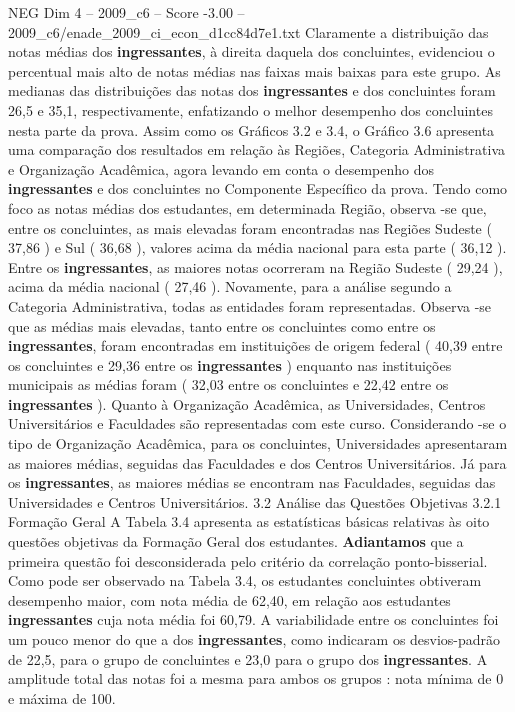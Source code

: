 \begin{textsample}{NEG Dim 4 – 2009\_c6 – Score -3.00 – 2009\_c6/enade\_2009\_ci\_econ\_d1cc84d7e1.txt}
Claramente a distribuição das notas médias dos \textbf{ingressantes}, à direita daquela dos concluintes, evidenciou o percentual mais alto de notas médias nas faixas mais baixas para este grupo.
As medianas das distribuições das notas dos \textbf{ingressantes} e dos concluintes foram 26,5 e 35,1, respectivamente, enfatizando o melhor desempenho dos concluintes nesta parte da prova.
Assim como os Gráficos 3.2 e 3.4, o Gráfico 3.6 apresenta uma comparação dos resultados em relação às Regiões, Categoria Administrativa e Organização Acadêmica, agora levando em conta o desempenho dos \textbf{ingressantes} e dos concluintes no Componente Específico da prova.
Tendo como foco as notas médias dos estudantes, em determinada Região, observa -se que, entre os concluintes, as mais elevadas foram encontradas nas Regiões Sudeste ( 37,86 ) e Sul ( 36,68 ), valores acima da média nacional para esta parte ( 36,12 ).
Entre os \textbf{ingressantes}, as maiores notas ocorreram na Região Sudeste ( 29,24 ), acima da média nacional ( 27,46 ).
Novamente, para a análise segundo a Categoria Administrativa, todas as entidades foram representadas.
Observa -se que as médias mais elevadas, tanto entre os concluintes como entre os \textbf{ingressantes}, foram encontradas em instituições de origem federal ( 40,39 entre os concluintes e 29,36 entre os \textbf{ingressantes} ) enquanto nas instituições municipais as médias foram ( 32,03 entre os concluintes e 22,42 entre os \textbf{ingressantes} ).
Quanto à Organização Acadêmica, as Universidades, Centros Universitários e Faculdades são representadas com este curso.
Considerando -se o tipo de Organização Acadêmica, para os concluintes, Universidades apresentaram as maiores médias, seguidas das Faculdades e dos Centros Universitários.
Já para os \textbf{ingressantes}, as maiores médias se encontram nas Faculdades, seguidas das Universidades e Centros Universitários. 3.2 Análise das Questões Objetivas 3.2.1 Formação Geral A Tabela 3.4 apresenta as estatísticas básicas relativas às oito questões objetivas da Formação Geral dos estudantes. \textbf{Adiantamos} que a primeira questão foi desconsiderada pelo critério da correlação ponto-bisserial.
Como pode ser observado na Tabela 3.4, os estudantes concluintes obtiveram desempenho maior, com nota média de 62,40, em relação aos estudantes \textbf{ingressantes} cuja nota média foi 60,79.
A variabilidade entre os concluintes foi um pouco menor do que a dos \textbf{ingressantes}, como indicaram os desvios-padrão de 22,5, para o grupo de concluintes e 23,0 para o grupo dos \textbf{ingressantes}.
A amplitude total das notas foi a mesma para ambos os grupos : nota mínima de 0 e máxima de 100.

\end{textsample}
